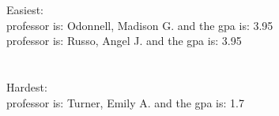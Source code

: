 Easiest:\\
professor is: Odonnell, Madison G. and the gpa is: 3.95\\
professor is: Russo, Angel J. and the gpa is: 3.95\\
\\\\
Hardest:\\
professor is: Turner, Emily A. and the gpa is: 1.7\\

